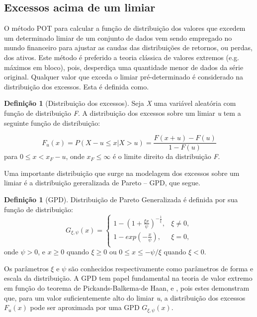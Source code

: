 \documentclass[review]{elsarticle}
\theoremstyle{definition}
\newtheorem{defi}[teor]{Definição}
\begin{document}
\subsection{Excessos acima de um limiar}
\label{sec:excess}

O método POT para calcular a função de distribuição dos valores que excedem um determinado limiar de um conjunto de dados vem sendo empregado no mundo financeiro para ajustar as caudas das distribuições de retornos, ou perdas, dos ativos. Este método é preferido a teoria clássica de valores extremos (e.g. máximos em bloco), pois, desperdiça uma quantidade menor de dados da série original. Qualquer valor que exceda o limiar pré-determinado é considerado na distribuição dos excessos. Esta é definida como.

\begin{defi}[Distribuição dos excessos] \label{defi:excess}
	Seja \emph{X} uma variável aleatória com função de distribuição \emph{F}. A distribuição dos excessos sobre um limiar \emph{u} tem a seguinte função de distribuição:
	
	\begin{equation}
	\label{eq:excessdist}
	F_u(x)=P(X-u \leq x | X > u)=\frac{F(x+u)-F(u)}{1-F(u)}
	\end{equation}
	para $0 \leq x < x_F-u$, onde $x_F \leq \infty$ é o limite direito da distribuição \emph{F}.
\end{defi}

Uma importante distribuição que surge na modelagem dos excessos sobre um limiar é a distribuição gereralizada de Pareto – GPD, que segue.

\begin{defi}[GPD] \label{defi:GPD}
	Distribuição de Pareto Generalizada é definida por sua função de distribuição:
	\begin{equation}
	\label{eq:GPD}
	G_{\xi,\psi}(x) = 
	\begin{cases}
	1- \left(1+ \frac{\xi x}{\psi} \right)^{-\frac{1}{\xi}}, & \xi \neq 0,\\
	1-exp\left(-\frac{x}{\psi}\right), & \xi = 0,\\
	\end{cases}
	\end{equation}
	onde $\psi > 0$, e $x\geq 0$ quando $\xi  \geq 0$ ou $0 \leq x \leq -\psi / \xi$ quando $\xi < 0$.
\end{defi}

Os parâmetros $\xi$ e $\psi$ são conhecidos respectivamente como parâmetros de forma e escala da distribuição. A GPD tem papel fundamental na teoria de valor extremo em função do teorema de Pickands-Balkema-de Haan, \cite{Pickands1975} e \cite{Balkema1974}, pois estes demonstram que, para um valor suficientemente alto do limiar \emph{u}, a distribuição dos excessos $F_u(x)$ pode ser aproximada por uma GPD $G_{\xi,\psi}(x)$.
\end{document}
